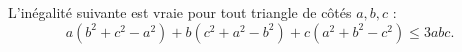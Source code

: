 L'inégalité suivante est vraie pour tout triangle de côtés $a, b, c$ :
\[ a(b^2 + c^2 - a^2) + b(c^2 + a^2 - b^2) + c(a^2 + b^2 - c^2) \leq 3abc. \]
